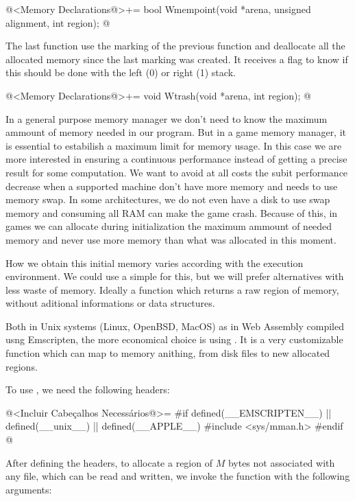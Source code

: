 \iniciocodigo
@<Memory Declarations@>+=
bool Wmempoint(void *arena, unsigned alignment, int region);
@
\fimcodigo

The last function use the marking of the previous function and
deallocate all the allocated memory since the last marking was
created. It receives a flag to know if this should be done with the
left (0) or right (1) stack.

\iniciocodigo
@<Memory Declarations@>+=
void Wtrash(void *arena, int region);
@
\fimcodigo



In a general purpose memory manager we don't need to know the maximum
ammount of memory needed in our program. But in a game memory manager,
it is essential to estabilish a maximum limit for memory usage. In
this case we are more interested in ensuring a continuous performance
instead of getting a precise result for some computation. We want to
avoid at all costs the subit performance decrease when a supported
machine don't have more memory and needs to use memory swap. In some
architectures, we do not even have a disk to use swap memory and
consuming all RAM can make the game crash. Because of this, in games
we can allocate during initialization the maximum ammount of needed
memory and never use more memory than what was allocated in this
moment.

How we obtain this initial memory varies according with the execution
environment. We could use a simple  for this, but
we will prefer alternatives with less waste of memory. Ideally a
function which returns a raw region of memory, without aditional
informations or data structures.

Both in Unix systems (Linux, OpenBSD, MacOS) as in Web Assembly
compiled usng Emscripten, the more economical choice is
using . It is a very customizable function which can
map to memory anithing, from disk files to new allocated regions.

To use  , we need the following headers:

\iniciocodigo
@<Incluir Cabeçalhos Necessários@>=
#if defined(__EMSCRIPTEN__) || defined(__unix__) || defined(__APPLE__)
#include <sys/mman.h>
#endif
@
\fimcodigo

After defining the headers, to allocate a region of $M$ bytes not
associated with any file, which can be read and written, we invoke the
function with the following arguments:

